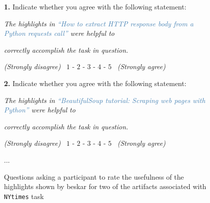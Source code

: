 \begin{figure}
\begin{mdframed}[backgroundcolor=gray!15] 
\begin{scriptsize}

\noindent \textbf{1.} Indicate whether you agree with the following statement:

\medskip

\quad \textit{The highlights in \textcolor{steelblue}{``How to extract HTTP response body from a Python requests call''} were helpful to} 

\quad \textit{correctly accomplish the task in question.}  \smallskip

\smallskip

\quad \quad \textit{(Strongly disagree)} ~$1$ - $2$ - $3$ - $4$ - $5$ ~\textit{(Strongly agree)} 


\bigskip


\noindent \textbf{2.} Indicate whether you agree with the following statement:

\medskip

\quad \textit{The highlights in \textcolor{steelblue}{``BeautifulSoup tutorial: Scraping web pages with Python''} were helpful to} 

\quad \textit{correctly accomplish the task in question.}  \smallskip

\smallskip

\quad \quad \textit{(Strongly disagree)} ~$1$ - $2$ - $3$ - $4$ - $5$ ~\textit{(Strongly agree)} 

\centering 

...

\end{scriptsize}
\end{mdframed}
\caption{Questions asking a participant to rate the usefulness of the highlights shown by \acs{beskar} for two of the artifacts associated with \texttt{NYtimes} task}
\label{fig:experiment-rating}
\end{figure}

    
